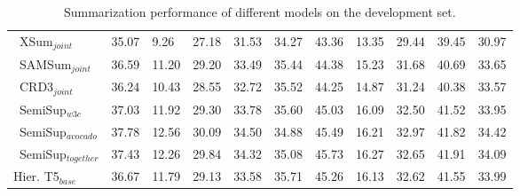 \begin{savenotes}
\begin{table*}
\begin{center}
\begin{tabular}{lllllllllll}
\ XSum$_{joint}$ & 35.07 & 9.26 & 27.18 & 31.53 & 34.27 & 43.36 & 13.35 & 29.44 & 39.45 & 30.97 \\
\ SAMSum$_{joint}$ & 36.59 & 11.20 & 29.20 & 33.49 & 35.44 & 44.38 & 15.23 & 31.68 & 40.69 & 33.65 \\
\ CRD3$_{joint}$ & 36.24 & 10.43 & 28.55 & 32.72 & 35.52 & 44.25 & 14.87 & 31.24 & 40.38 & 33.57  \\
\cmidrule(lr){1-1}
\ SemiSup$_{w3c}$ & 37.03 & 11.92 & 29.30 & 33.78 & 35.60 & 45.03 & 16.09 & 32.50 & 41.52 & 33.95 \\
\ SemiSup$_{avocado}$ & 37.78 & 12.56 & 30.09 & 34.50 & 34.88 & 45.49 & 16.21 & 32.97 & 41.82 & 34.42 \\
\ SemiSup$_{together}$ & 37.43 & 12.26 & 29.84 & 34.32 & 35.08 & 45.73 & 16.27 & 32.65 & 41.91 & 34.09 \\
\cmidrule(lr){1-1}
Hier. T5$_{base}$ & 36.67 & 11.79 & 29.13 & 33.58 & 35.71 & 45.26 & 16.13 & 32.62 & 41.55 & 33.99 \\
\toprule
\end{tabular}
\end{center}
\vspace{-12pt}
\caption{Summarization performance of different models on the development set.}
\label{tab:dev}
\vspace{-12pt}
\end{table*}
\end{savenotes}


